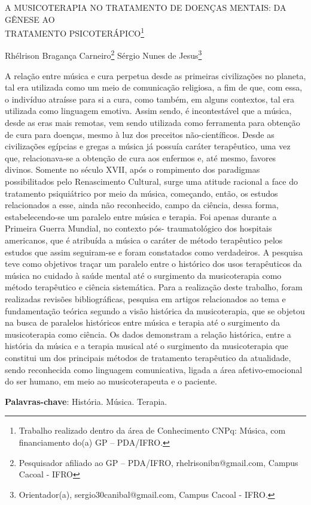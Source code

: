 \documentclass[article,12pt,onesidea,4paper,english,brazil]{abntex2}
\begin{document}
	
	
	\frenchspacing 
	
	\begin{center}
		\LARGE A MUSICOTERAPIA NO TRATAMENTO DE DOENÇAS MENTAIS: DA GÊNESE AO\\TRATAMENTO PSICOTERÁPICO\footnote{Trabalho realizado dentro da área de Conhecimento CNPq: Música, com financiamento do(a) GP -- PDA/IFRO.}
		
		\normalsize
		Rhélrison Bragança Carneiro\footnote{Pesquisador afiliado ao GP -- PDA/IFRO, rhelrisonibn@gmail.com, Campus Cacoal - IFRO} 
		Sérgio Nunes de Jesus\footnote{Orientador(a), sergio30canibal@gmail.com, Campus Cacoal - IFRO.} 
	
	\end{center}
	
	\noindent A relação entre música e cura perpetua desde as primeiras civilizações no planeta, tal era utilizada como um meio de comunicação religiosa, a fim de que, com essa, o indivíduo atraísse para si a cura, como também, em alguns contextos, tal era utilizada como linguagem emotiva. Assim sendo, é incontestável que a música, desde as eras mais remotas, vem sendo utilizada como ferramenta para obtenção de cura para doenças, mesmo à luz dos preceitos não-científicos. 
	Desde as civilizações egípcias e gregas a música já possuía caráter terapêutico, uma vez que, relacionava-se a obtenção de cura aos enfermos e, até mesmo, favores divinos.
	Somente no século XVII, após o rompimento dos paradigmas possibilitados pelo Renascimento Cultural, surge uma atitude racional a face do tratamento psiquiátrico por meio da música, começando, então, os estudos relacionados a esse, ainda não reconhecido, campo da ciência, dessa forma, estabelecendo-se um paralelo entre música e terapia. 
	Foi apenas durante a Primeira Guerra Mundial, no contexto pós- traumatológico dos hospitais americanos, que é atribuída a música o caráter de método terapêutico pelos estudos que assim seguiram-se e foram constatados como verdadeiros. 
	A pesquisa teve como objetivos traçar um paralelo entre o histórico dos usos terapêuticos da música no cuidado à saúde mental até o surgimento da musicoterapia como método terapêutico e ciência sistemática. Para a realização deste trabalho, foram realizadas revisões bibliográficas, pesquisa em artigos relacionados ao tema e fundamentação teórica segundo a visão histórica da musicoterapia, que se objetou na busca de paralelos históricos entre música e terapia até o surgimento da musicoterapia como ciência. 
	Os dados demonstram a relação histórica, entre a história da música e a terapia musical até o surgimento da musicoterapia que constitui um dos principais métodos de tratamento terapêutico da atualidade, sendo reconhecida como linguagem comunicativa, ligada a área afetivo-emocional do ser humano, em meio ao musicoterapeuta e o paciente.
	
	\vspace{\onelineskip}
	
	\noindent
	\textbf{Palavras-chave}: História. Música. Terapia.
	
\end{document}
